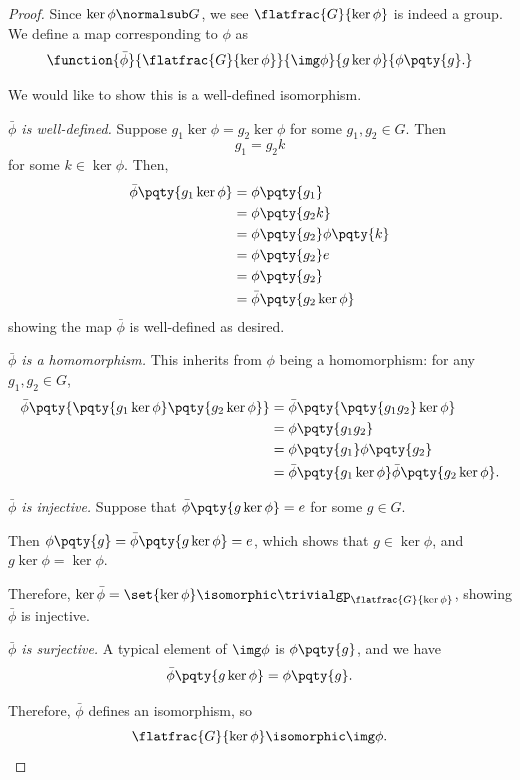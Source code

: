 \begin{proof}
    Since \(\ker \phi \normalsub G\), we see \(\flatfrac{G}{\ker \phi}\) is indeed a group. We define a map corresponding to \(\phi\) as
    \[
        \function{\bar{\phi}}{\flatfrac{G}{\ker \phi}}{\img \phi}{g \ker \phi}{\phi \pqty{g}.}
    \]

    We would like to show this is a well-defined isomorphism.

    \emph{\(\bar{\phi}\) is well-defined.} Suppose \(g_1 \ker \phi = g_2 \ker \phi\) for some \(g_1, g_2 \in G\). Then
    \[
        g_1 = g_2 k
    \]
    for some \(k \in \ker \phi\). Then,
    \begin{align*}
            \bar{\phi} \pqty{g_1 \ker \phi} &= \phi\pqty{g_1} \\
            &= \phi\pqty{g_2 k} \\
            &= \phi\pqty{g_2} \phi\pqty{k} \\
            &= \phi\pqty{g_2} e \\
            &= \phi\pqty{g_2} \\
            &= \bar{\phi} \pqty{g_2 \ker \phi}
    \end{align*}
    showing the map \(\bar{\phi}\) is well-defined as desired.

    \emph{\(\bar{\phi}\) is a homomorphism.} This inherits from \(\phi\) being a homomorphism: for any \(g_1, g_2 \in G\),
    \begin{align*}
        \bar{\phi} \pqty{\pqty{g_1 \ker \phi} \pqty{g_2 \ker \phi}} &= \bar{\phi} \pqty{\pqty{g_1 g_2} \ker \phi} \\
        &= \phi \pqty{g_1 g_2} \\
        &= \phi \pqty{g_1} \phi \pqty{g_2} \\
        &= \bar{\phi} \pqty{g_1 \ker \phi} \bar{\phi} \pqty{g_2 \ker \phi}.
    \end{align*}

    \emph{\(\bar{\phi}\) is injective.} Suppose that \(\bar{\phi} \pqty{g \ker \phi} = e\) for some \(g \in G\).
    
    Then \(\phi\pqty{g} = \bar{\phi} \pqty{g \ker \phi} = e\), which shows that \(g \in \ker \phi\), and \(g \ker \phi = \ker \phi\).

    Therefore, \(\ker \bar{\phi} = \set{\ker \phi} \isomorphic \trivialgp_{\flatfrac{G}{\ker \phi}}\), showing \(\bar{\phi}\) is injective.

    \emph{\(\bar{\phi}\) is surjective.} A typical element of \(\img \phi\) is \(\phi\pqty{g}\), and we have
    \[
        \bar{\phi} \pqty{g \ker \phi} = \phi\pqty{g}.
    \]

    Therefore, \(\bar{\phi}\) defines an isomorphism, so
    \[
        \flatfrac{G}{\ker \phi} \isomorphic \img \phi.
    \]
\end{proof}

